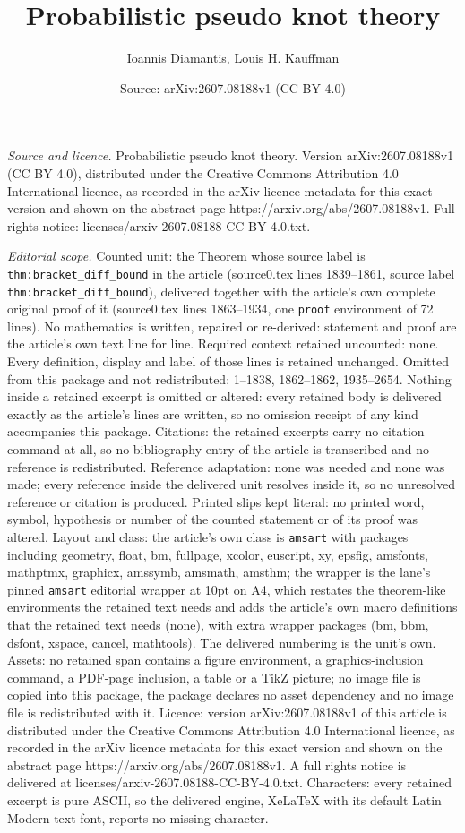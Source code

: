 \documentclass[10pt,a4paper]{amsart}
\title[Probabilistic pseudo knot theory]{Probabilistic pseudo knot theory}
\author{Ioannis Diamantis, Louis H. Kauffman}
\date{Source: arXiv:2607.08188v1 (CC BY 4.0)}
\begin{document}
\maketitle

\noindent\emph{Source and licence.} Probabilistic pseudo knot theory. Version arXiv:2607.08188v1 (CC BY 4.0), distributed under the Creative Commons Attribution 4.0 International licence, as recorded in the arXiv licence metadata for this exact version and shown on the abstract page https://arxiv.org/abs/2607.08188v1. Full rights notice: licenses/arxiv-2607.08188-CC-BY-4.0.txt.\par\smallskip

\noindent\textit{Editorial scope.} Counted unit: the Theorem whose source label is \texttt{thm:bracket\_diff\_bound} in the article (source0.tex lines 1839--1861, source label \texttt{thm:bracket\_diff\_bound}), delivered together with the article's own complete original proof of it (source0.tex lines 1863--1934, one \texttt{proof} environment of 72 lines). No mathematics is written, repaired or re-derived: statement and proof are the article's own text line for line. Required context retained uncounted: none. Every definition, display and label of those lines is retained unchanged. Omitted from this package and not redistributed: 1--1838, 1862--1862, 1935--2654. Nothing inside a retained excerpt is omitted or altered: every retained body is delivered exactly as the article's lines are written, so no omission receipt of any kind accompanies this package. Citations: the retained excerpts carry no citation command at all, so no bibliography entry of the article is transcribed and no reference is redistributed. Reference adaptation: none was needed and none was made; every reference inside the delivered unit resolves inside it, so no unresolved reference or citation is produced. Printed slips kept literal: no printed word, symbol, hypothesis or number of the counted statement or of its proof was altered. Layout and class: the article's own class is \texttt{amsart} with packages including geometry, float, bm, fullpage, xcolor, euscript, xy, epsfig, amsfonts, mathptmx, graphicx, amssymb, amsmath, amsthm; the wrapper is the lane's pinned \texttt{amsart} editorial wrapper at 10pt on A4, which restates the theorem-like environments the retained text needs and adds the article's own macro definitions that the retained text needs (none), with extra wrapper packages (bm, bbm, dsfont, xspace, cancel, mathtools). The delivered numbering is the unit's own. Assets: no retained span contains a figure environment, a graphics-inclusion command, a PDF-page inclusion, a table or a TikZ picture; no image file is copied into this package, the package declares no asset dependency and no image file is redistributed with it. Licence: version arXiv:2607.08188v1 of this article is distributed under the Creative Commons Attribution 4.0 International licence, as recorded in the arXiv licence metadata for this exact version and shown on the abstract page https://arxiv.org/abs/2607.08188v1. A full rights notice is delivered at licenses/arxiv-2607.08188-CC-BY-4.0.txt. Characters: every retained excerpt is pure ASCII, so the delivered engine, XeLaTeX with its default Latin Modern text font, reports no missing character.
\end{document}
